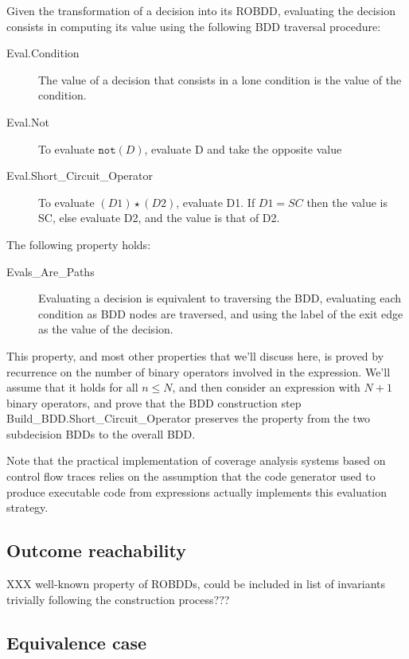 \documentclass[a4paper,12pt,twoside]{article}
\renewcommand{\le}{\leqslant}
\newcommand{\anysc}{\star}
\newcommand{\adanot}{\texttt{not}}
\begin{document}
Given the transformation of a decision into its ROBDD, evaluating the
decision consists in computing its value using the following BDD traversal
procedure:

\begin{description}
\item[Eval.Condition]
  The value of a decision that consists in a lone condition is the
  value of the condition.

\item[Eval.Not]
  To evaluate $\adanot{} (D)$, evaluate D and take the opposite value

\item[Eval.Short\_Circuit\_Operator]
  To evaluate $(D1) \anysc{} (D2)$, evaluate D1. If $D1 = SC$ then the
  value is SC, else evaluate D2, and the value is that of D2.
\end{description}

The following property holds:

\begin{description}
\item[Evals\_Are\_Paths]
  Evaluating a decision is equivalent to traversing the BDD, evaluating
  each condition as BDD nodes are traversed, and using the label of the
  exit edge as the value of the decision.
\end{description}

This property, and most other properties that we'll discuss here,
is proved by recurrence on the number of binary operators involved in
the expression. We'll assume that it holds for all $n \le{} N$, and then
consider an expression with $N+1$ binary operators, and prove that
the BDD construction step Build\_BDD.Short\_Circuit\_Operator preserves
the property from the two subdecision BDDs to the overall BDD.

Note that the practical implementation of coverage analysis systems based
on control flow traces relies on the assumption that the code generator
used to produce executable code from expressions actually implements this
evaluation strategy.

\subsection{Outcome reachability}

XXX well-known property of ROBDDs, could be included in list
of invariants trivially following the construction process???

\subsection{Equivalence case}
\end{document}
